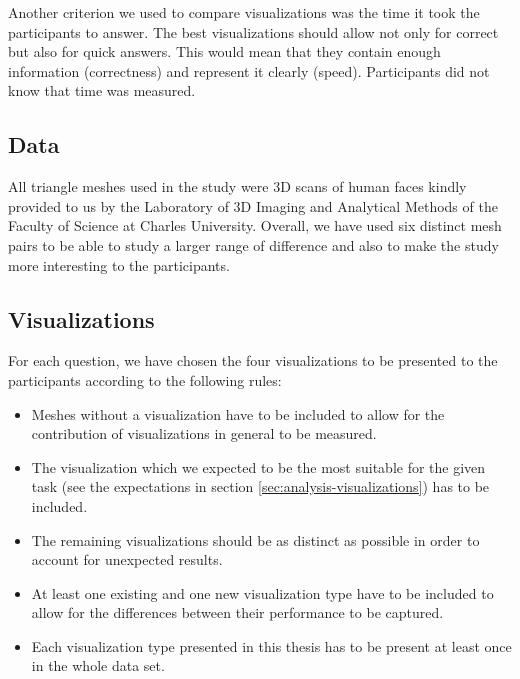 Another criterion we used to compare visualizations was the time it took the participants to answer. The best visualizations should allow not only for correct but also for quick answers. This would mean that they contain enough information (correctness) and represent it clearly (speed). Participants did not know that time was measured.

\subsection{Data}
\label{subsec:user_study-setting-data}

All triangle meshes used in the study were 3D scans of human faces kindly provided to us by the Laboratory of 3D Imaging and Analytical Methods of the Faculty of Science at Charles University. Overall, we have used six distinct mesh pairs to be able to study a larger range of difference and also to make the study more interesting to the participants.

\subsection{Visualizations}
\label{subsec:user_study-setting-visualization}

For each question, we have chosen the four visualizations to be presented to the participants according to the following rules:

\begin{itemize}
\item Meshes without a visualization have to be included to allow for the contribution of visualizations in general to be measured.
\item The visualization which we expected to be the most suitable for the given task (see the expectations in section \ref{sec:analysis-visualizations}) has to be included.
\item The remaining visualizations should be as distinct as possible in order to account for unexpected results.
\item At least one existing and one new visualization type have to be included to allow for the differences between their performance to be captured.
\item Each visualization type presented in this thesis has to be present at least once in the whole data set.
\end{itemize}


